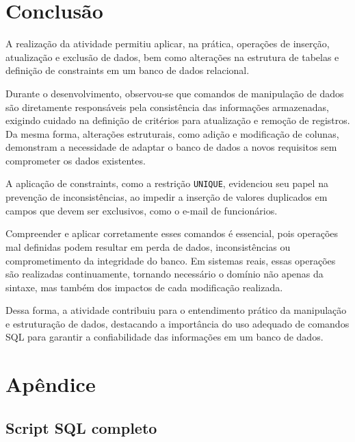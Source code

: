 \documentclass[12pt,a4paper]{article}
\begin{document}
\section{Conclusão}

A realização da atividade permitiu aplicar, na prática, operações de inserção, atualização e exclusão de dados, bem como alterações na estrutura de tabelas e definição de constraints em um banco de dados relacional.

Durante o desenvolvimento, observou-se que comandos de manipulação de dados são diretamente responsáveis pela consistência das informações armazenadas, exigindo cuidado na definição de critérios para atualização e remoção de registros. Da mesma forma, alterações estruturais, como adição e modificação de colunas, demonstram a necessidade de adaptar o banco de dados a novos requisitos sem comprometer os dados existentes.

A aplicação de constraints, como a restrição \texttt{UNIQUE}, evidenciou seu papel na prevenção de inconsistências, ao impedir a inserção de valores duplicados em campos que devem ser exclusivos, como o e-mail de funcionários.

Compreender e aplicar corretamente esses comandos é essencial, pois operações mal definidas podem resultar em perda de dados, inconsistências ou comprometimento da integridade do banco. Em sistemas reais, essas operações são realizadas continuamente, tornando necessário o domínio não apenas da sintaxe, mas também dos impactos de cada modificação realizada.

Dessa forma, a atividade contribuiu para o entendimento prático da manipulação e estruturação de dados, destacando a importância do uso adequado de comandos SQL para garantir a confiabilidade das informações em um banco de dados.

\section{Apêndice}

\subsection{Script SQL completo}


\end{document}
